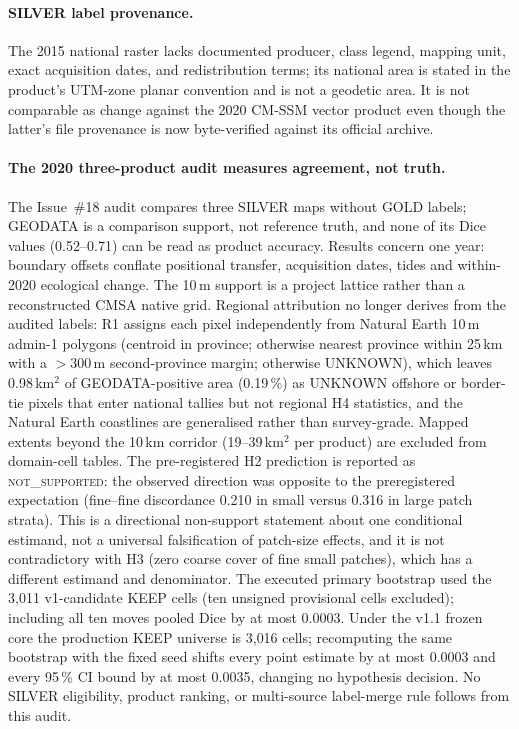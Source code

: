 \paragraph{SILVER label provenance.}
The 2015 national raster lacks documented producer, class legend,
mapping unit, exact acquisition dates, and redistribution terms; its
national area is stated in the product's UTM-zone planar convention
and is not a geodetic area. It is not comparable as change against the
2020 CM-SSM vector product even though the latter's file provenance is
now byte-verified against its official archive.

\paragraph{The 2020 three-product audit measures agreement, not truth.}
The Issue~\#18 audit compares three SILVER maps without GOLD labels;
GEODATA is a comparison support, not reference truth, and none of its
Dice values (0.52--0.71) can be read as product accuracy. Results
concern one year: boundary offsets conflate positional transfer,
acquisition dates, tides and within-2020 ecological change. The 10\,m
support is a project lattice rather than a reconstructed CMSA native
grid. Regional attribution no longer derives from the audited labels:
R1 assigns each pixel independently from Natural Earth 10\,m admin-1
polygons (centroid in province; otherwise nearest province within
25\,km with a $>$300\,m second-province margin; otherwise UNKNOWN),
which leaves 0.98\,km$^2$ of GEODATA-positive area (0.19\,\%) as
UNKNOWN offshore or border-tie pixels that enter national tallies but
not regional H4 statistics, and the Natural Earth coastlines are
generalised rather than survey-grade. Mapped extents beyond the 10\,km
corridor (19--39\,km$^2$ per product) are excluded from domain-cell
tables. The pre-registered H2 prediction is reported as
\textsc{not\_supported}: the observed direction was opposite to the
preregistered expectation (fine--fine discordance 0.210 in small
versus 0.316 in large patch strata). This is a directional non-support
statement about one conditional estimand, not a universal falsification
of patch-size effects, and it is not contradictory with H3 (zero coarse
cover of fine small patches), which has a different estimand and
denominator. The executed primary bootstrap used the 3{,}011 v1-candidate KEEP
cells (ten unsigned provisional cells excluded); including all ten
moves pooled Dice by at most 0.0003. Under the v1.1 frozen core the
production KEEP universe is 3{,}016 cells; recomputing the same
bootstrap with the fixed seed shifts every point estimate by at most
0.0003 and every 95\,\% CI bound by at most 0.0035, changing no
hypothesis decision. No SILVER eligibility,
product ranking, or multi-source label-merge rule follows from this
audit.

